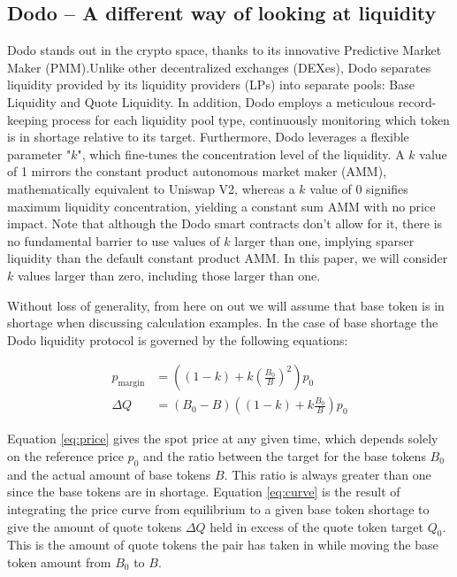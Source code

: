 \documentclass [10pt, twoside] {article}
\begin{document}
\subsection{Dodo -- A different way of looking at liquidity} \label{subsubDodo}
Dodo stands out in the crypto space, thanks to its innovative Predictive Market Maker (PMM).Unlike other decentralized exchanges (DEXes), Dodo separates liquidity provided by its liquidity providers (LPs) into separate pools: Base Liquidity and Quote Liquidity. In addition, Dodo employs a meticulous record-keeping process for each liquidity pool type, continuously monitoring which token is in shortage relative to its target. Furthermore, Dodo leverages a flexible parameter "$k$", which fine-tunes the concentration level of the liquidity. A $k$ value of 1 mirrors the constant product autonomous market maker (AMM), mathematically equivalent to Uniswap V2, whereas a $k$ value of 0 signifies maximum liquidity concentration, yielding a constant sum AMM with no price impact. Note that although the Dodo smart contracts don't allow for it, there is no fundamental barrier to use values of $k$ larger than one, implying sparser liquidity than the default constant product AMM. In this paper, we will consider $k$ values larger than zero, including those larger than one.

Without loss of generality, from here on out we will assume that base token is in shortage when discussing calculation examples. In the case of base shortage the Dodo liquidity protocol is governed by the following equations:

\begin{align}
p_{\text{margin}} & = \left( (1-k) + k\left(\frac{B_0}{B}\right)^2 \right) p_0 \label{eq:price} \\
\Delta Q & = \left( B_{0} - B \right) \left( (1-k) + k\frac{B_{0}}{B} \right) p_{0} \label{eq:curve}
\end{align}

Equation \ref{eq:price} gives the spot price at any given time, which depends solely on the reference price $p_0$ and the ratio between the target for the base tokens $B_0$ and the actual amount of base tokens $B$. This ratio is always greater than one since the base tokens are in shortage. Equation \ref{eq:curve} is the result of integrating the price curve from equilibrium to a given base token shortage to give the amount of quote tokens $\Delta Q$ held in excess of the quote token target $Q_0$. This is the amount of quote tokens the pair has taken in while moving the base token amount from $B_0$ to $B$.
\end{document}
